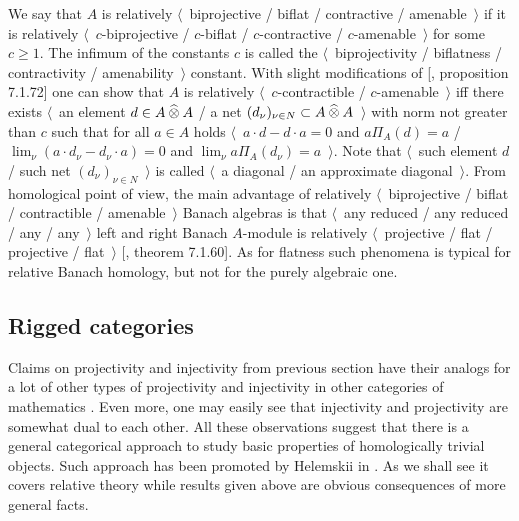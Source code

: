 We say that $A$ is relatively $\langle$~biprojective / biflat / contractive / amenable~$\rangle$ if it is relatively $\langle$~$c$-biprojective / $c$-biflat / $c$-contractive / $c$-amenable~$\rangle$ for some $c\geq 1$. The infimum of the constants $c$ is called the $\langle$~biprojectivity / biflatness / contractivity / amenability~$\rangle$ constant.  With slight modifications of [\cite{HelBanLocConvAlg}, proposition 7.1.72] one can show that $A$ is relatively $\langle$~$c$-contractible / $c$-amenable~$\rangle$ iff there exists $\langle$~an element $d\in A\mathbin{\widehat{\otimes}} A$ / a net $(d_\nu)_{\nu\in N}\subset A\mathbin{\widehat{\otimes}} A$~$\rangle$ with norm not greater than $c$ such that for all $a\in A$ holds $\langle$~$a\cdot d-d\cdot a=0$ and $a\Pi_A(d)=a$ / $\lim_\nu(a\cdot d_\nu-d_\nu\cdot a)=0$ and $\lim_\nu a\Pi_A(d_\nu)=a$~$\rangle$. Note that $\langle$~such element $d$ / such net $(d_\nu)_{\nu\in N}$~$\rangle$ is called $\langle$~a diagonal / an approximate diagonal~$\rangle$. From homological point of view, the main advantage of relatively $\langle$~biprojective / biflat / contractible / amenable~$\rangle$ Banach algebras is that $\langle$~any reduced / any reduced / any / any~$\rangle$ left and right Banach $A$-module is relatively $\langle$~projective / flat / projective / flat~$\rangle$ [\cite{HelBanLocConvAlg}, theorem 7.1.60]. As for flatness such phenomena is typical for relative Banach homology, but not for the purely algebraic one.


\subsection{Rigged categories}
\label{SubSectionRiggedCategories}

Claims on projectivity and injectivity from previous section have their analogs for a lot of other types of projectivity and injectivity in other categories of mathematics \cite{SemadeniProjInjDual}. Even more, one may easily see that injectivity and projectivity are somewhat dual to each other. All these observations suggest that there is a general categorical approach to study basic properties of homologically trivial objects. Such approach has been promoted by Helemskii in \cite{HelMetrFrQMod}. As we shall see it covers relative theory while results given above are obvious consequences of more general facts. 

